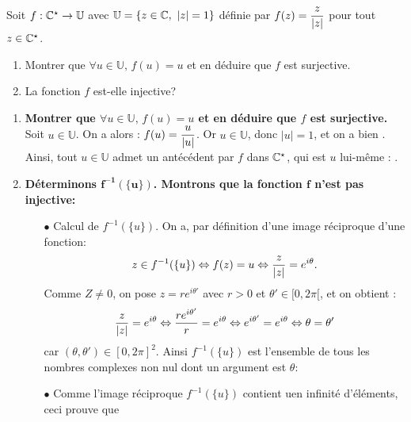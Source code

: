 \documentclass[a4paper, 11pt,reqno]{article}
\begin{document}
\begin{exercice}  \;
	Soit $f: \mathbb{C}^{\star}\rightarrow \mathbb{U}$ avec $\mathbb{U}=\left\lbrace z\in\bC,\ |z|=1\right\rbrace$ d\'efinie par $f(z)=\displaystyle\frac{z}{|z|}$ pour tout $z\in\mathbb{C}^{\star}$.
	\begin{enumerate}
		\item Montrer que $\forall u \in \mathbb{U}, \, f(u)=u$ et en d\'eduire que $f$ est surjective.
		\item %
		      La fonction $f$ est-elle injective?
	\end{enumerate}
\end{exercice}

\begin{correction} \;
	\begin{enumerate}
		\item \textbf{Montrer que $\forall u \in \mathbb{U}, \, f(u)=u$ et en d\'eduire que $f$ est surjective.}\\
		      Soit $u \in \mathbb{U}$. On a alors : $\displaystyle f(u) = \frac{u}{|u|}$. Or $u \in \mathbb{U}$, donc $|u|=1$, et on a bien .\\
		      Ainsi, tout $u \in \mathbb{U}$ admet un ant\'ec\'edent par $f$ dans $\mathbb{C}^\star$, qui est $u$ lui-m\^eme :  .
		\item \textbf{D\'eterminons $\mathbf{f^{-1}(\lbrace u\rbrace)}$. Montrons que la fonction $\mathbf{f}$ n'est pas injective:}
		      \begin{itemize}
			      \item[$\bullet$] Calcul de $f^{-1}(\lbrace u\rbrace)$. On a, par d\'efinition d'une image r\'eciproque d'une fonction:
				      $$z\in f^{-1}(\lbrace u\rbrace)\Leftrightarrow f(z)=u\Leftrightarrow \displaystyle\frac{z}{|z|}=e^{i\theta}.$$
				      Comme $Z\not=0$, on pose $z=re^{i\theta'}$ avec $r>0$ et $\theta' \in [0,2\pi[$, et on obtient :
				      $$ \displaystyle\frac{z}{|z|}=e^{i\theta} \Leftrightarrow  \frac{re^{i\theta'}}{r} = e^{i\theta} \Leftrightarrow e^{i\theta'} = e^{i\theta}  \Leftrightarrow \theta = \theta'$$
				      car $(\theta, \theta') \in [0,2\pi]^2$. Ainsi $f^{-1}(\lbrace u\rbrace)$ est l'ensemble de tous les nombres complexes non nul dont un argument est $\theta$: 
			      \item[$\bullet$] Comme l'image r\'eciproque $f^{-1}(\lbrace u\rbrace)$ contient uen infinit\'e d'\'el\'ements, ceci prouve que 
		      \end{itemize}
	\end{enumerate}
\end{correction}
\end{document}
